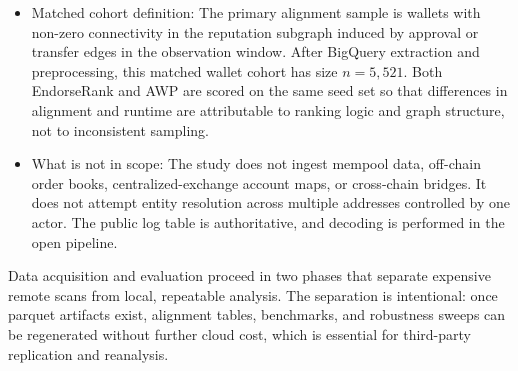 \begin{itemize}
\item Matched cohort definition: The primary alignment sample is wallets with non-zero connectivity in the reputation subgraph induced by approval or transfer edges in the observation window. After BigQuery extraction and preprocessing, this matched wallet cohort has size $n=5{,}521$. Both EndorseRank and AWP are scored on the same seed set so that differences in alignment and runtime are attributable to ranking logic and graph structure, not to inconsistent sampling.

\item What is not in scope: The study does not ingest mempool data, off-chain order books, centralized-exchange account maps, or cross-chain bridges. It does not attempt entity resolution across multiple addresses controlled by one actor. The public log table is authoritative, and decoding is performed in the open pipeline.

\end{itemize}


Data acquisition and evaluation proceed in two phases that separate expensive remote scans from local, repeatable analysis. The separation is intentional: once parquet artifacts exist, alignment tables, benchmarks, and robustness sweeps can be regenerated without further cloud cost, which is essential for third-party replication and reanalysis.

